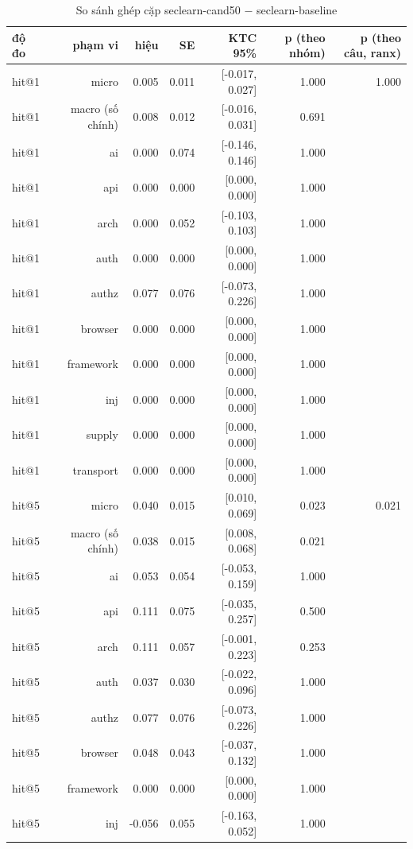 \begin{table}[ht]
\centering
\caption{So sánh ghép cặp seclearn-cand50 $-$ seclearn-baseline}
\begin{tabular}{lrrrrrr}
\toprule
độ đo & phạm vi & hiệu & SE & KTC 95\% & p (theo nhóm) & p (theo câu, ranx) \\
\midrule
hit@1 & micro & 0.005 & 0.011 & [-0.017, 0.027] & 1.000 & 1.000 \\
hit@1 & macro (số chính) & 0.008 & 0.012 & [-0.016, 0.031] & 0.691 &  \\
hit@1 & ai & 0.000 & 0.074 & [-0.146, 0.146] & 1.000 &  \\
hit@1 & api & 0.000 & 0.000 & [0.000, 0.000] & 1.000 &  \\
hit@1 & arch & 0.000 & 0.052 & [-0.103, 0.103] & 1.000 &  \\
hit@1 & auth & 0.000 & 0.000 & [0.000, 0.000] & 1.000 &  \\
hit@1 & authz & 0.077 & 0.076 & [-0.073, 0.226] & 1.000 &  \\
hit@1 & browser & 0.000 & 0.000 & [0.000, 0.000] & 1.000 &  \\
hit@1 & framework & 0.000 & 0.000 & [0.000, 0.000] & 1.000 &  \\
hit@1 & inj & 0.000 & 0.000 & [0.000, 0.000] & 1.000 &  \\
hit@1 & supply & 0.000 & 0.000 & [0.000, 0.000] & 1.000 &  \\
hit@1 & transport & 0.000 & 0.000 & [0.000, 0.000] & 1.000 &  \\
hit@5 & micro & 0.040 & 0.015 & [0.010, 0.069] & 0.023 & 0.021 \\
hit@5 & macro (số chính) & 0.038 & 0.015 & [0.008, 0.068] & 0.021 &  \\
hit@5 & ai & 0.053 & 0.054 & [-0.053, 0.159] & 1.000 &  \\
hit@5 & api & 0.111 & 0.075 & [-0.035, 0.257] & 0.500 &  \\
hit@5 & arch & 0.111 & 0.057 & [-0.001, 0.223] & 0.253 &  \\
hit@5 & auth & 0.037 & 0.030 & [-0.022, 0.096] & 1.000 &  \\
hit@5 & authz & 0.077 & 0.076 & [-0.073, 0.226] & 1.000 &  \\
hit@5 & browser & 0.048 & 0.043 & [-0.037, 0.132] & 1.000 &  \\
hit@5 & framework & 0.000 & 0.000 & [0.000, 0.000] & 1.000 &  \\
hit@5 & inj & -0.056 & 0.055 & [-0.163, 0.052] & 1.000 &  \\

\end{tabular}
\end{table}

